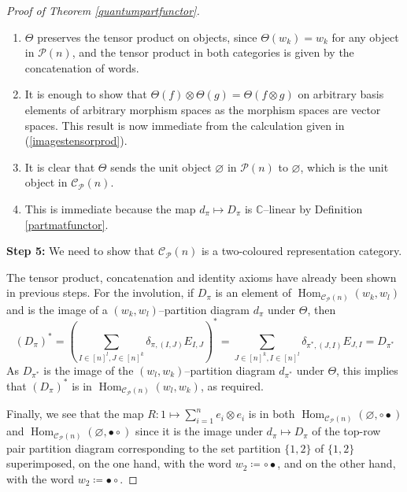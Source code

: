 \documentclass{article}
\DeclareMathOperator{\Hom}{Hom}
\theoremstyle{plain}
\theoremstyle{definition}
\theoremstyle{remark}
\begin{document}
\begin{proof}[Proof of Theorem \ref{quantumpartfunctor}]
	\begin{enumerate}
		\item $\Theta$ preserves the tensor product on objects, 
			since $\Theta(w_k) = w_k$ for any object in $\mathcal{P}(n)$, 
			and the tensor product in both categories is given by 
			the concatenation of words.
		\item It is enough to show that $\Theta(f) \otimes \Theta(g) = \Theta(f \otimes g)$ on arbitrary basis elements of arbitrary morphism spaces as the morphism spaces are vector spaces. This result is now immediate from the calculation given in 
		(\ref{imagestensorprod}).
		\item It is clear that
			$\Theta$ sends the unit object $\varnothing$ 
			in $\mathcal{P}(n)$ to $\varnothing$,
			which is the unit object in $\mathcal{C}_{\mathcal{P}}(n)$.
		\item This is immediate because the map $d_\pi \mapsto D_\pi$
			is $\mathbb{C}$--linear by Definition \ref{partmatfunctor}.
	\end{enumerate}

	\textbf{Step 5:} We need to show that $\mathcal{C}_{\mathcal{P}}(n)$ is a
	two-coloured representation category.
	
	The tensor product, concatenation and identity axioms have already
	been shown in previous steps.
	For the involution, if $D_\pi$ is an element of
	$\Hom_{\mathcal{C}_{\mathcal{P}}(n)}(w_k,w_l)$ and
	is the image of a $(w_k, w_l)$--partition diagram
	$d_\pi$ under $\Theta$,
	then
	\begin{equation}
		(D_\pi)^*
		=
		\left(
		\sum_{I \in [n]^l, J \in [n]^k}
		\delta_{\pi, (I,J)}
		E_{I,J}
		\right)^*
		= 
		\sum_{J \in [n]^k, I \in [n]^l}
		\delta_{\pi^*, (J,I)}
		E_{J,I}
		=
		D_{\pi^*}
	\end{equation}
	As $D_{\pi^*}$ is the image of the $(w_l, w_k)$--partition diagram
	$d_{\pi^*}$ under $\Theta$, this implies
	that $(D_\pi)^*$ is in $\Hom_{\mathcal{C}_{\mathcal{P}}(n)}(w_l,w_k)$,
	as required.

	Finally, we see that the map 
	$R : 1 \mapsto \sum_{i=1}^{n} e_i \otimes e_i$
	is in both 
	$\Hom_{\mathcal{C}_{\mathcal{P}}(n)}(\varnothing, \circ\bullet)$ 
	and
	$\Hom_{\mathcal{C}_{\mathcal{P}}(n)}(\varnothing, \bullet\circ)$
	since it is the image under $d_\pi \mapsto D_\pi$
	of the top-row pair partition diagram corresponding to the set
	partition $\{1,2\}$ of $\{1,2\}$ superimposed, on the one hand,
	with the word $w_2 \coloneqq \circ \bullet$,
	and on the other hand,
	with the word $w_2 \coloneqq \bullet\circ$.


\end{proof}
\end{document}
